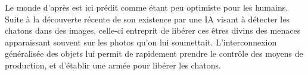 \label{index_md_README}%
%
 Le monde d’après est ici prédit comme étant peu optimiste pour les humains. Suite à la découverte récente de son existence par une IA visant à détecter les chatons dans des images, celle-\/ci entreprit de libérer ces êtres divins des menaces apparaissant souvent sur les photos qu’on lui soumettait. L’interconnexion généralisée des objets lui permit de rapidement prendre le contrôle des moyens de production, et d’établir une armée pour libérer les chatons. 